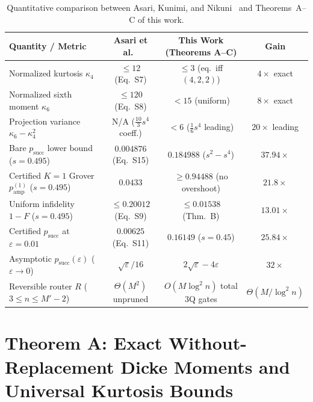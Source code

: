 \documentclass[11pt,a4paper]{article}
\theoremstyle{remark}
\begin{document}
\begin{table}[t]
\centering
\caption{Quantitative comparison between Asari, Kunimi, and Nikuni~\cite{AKN26} and Theorems~A--C of this work.}
\label{tab:summary}
\footnotesize
\setlength{\tabcolsep}{4.5pt}
\begin{tabular}{@{}lccc@{}}
\toprule
Quantity / Metric & Asari et al.~\cite{AKN26} & This Work (Theorems A--C) & Gain \\
\midrule
Normalized kurtosis $\kappa_4$ & $\le 12$ (Eq.~S7) & $\le 3$ (eq.\ iff $(4,2,2)$) & $4\times$ exact \\
Normalized sixth moment $\kappa_6$ & $\le 120$ (Eq.~S8) & $< 15$ (uniform) & $8\times$ exact \\
Projection variance $\kappa_6 - \kappa_4^2$ & N/A ($\frac{10}{3} s^4$ coeff.) & $< 6$ ($\frac{1}{6} s^4$ leading) & $20\times$ leading \\
Bare $p_{\mathrm{succ}}$ lower bound ($s = 0.495$) & $0.004876$ (Eq.~S15) & $0.184988$ ($s^2 - s^4$) & $37.94\times$ \\
Certified $K=1$ Grover $p_{\mathrm{amp}}^{(1)}$ ($s = 0.495$) & $0.0433$ & $\ge 0.94488$ (no overshoot) & $21.8\times$ \\
Uniform infidelity $1 - F$ ($s = 0.495$) & $\le 0.20012$ (Eq.~S9) & $\le 0.01538$ (Thm.~B) & $13.01\times$ \\
Certified $p_{\mathrm{succ}}$ at $\varepsilon = 0.01$ & $0.00625$ (Eq.~S11) & $0.16149$ ($s = 0.45$) & $25.84\times$ \\
Asymptotic $p_{\mathrm{succ}}(\varepsilon)$ ($\varepsilon \to 0$) & $\sqrt{\varepsilon}/16$ & $2\sqrt{\varepsilon} - 4\varepsilon$ & $32\times$ \\
Reversible router $R$ ($3 \le n \le M'-2$) & $\Theta(M^2)$ unpruned & $O(M\log^2 n)$ total 3Q gates & $\Theta(M/\log^2 n)$ \\
\bottomrule
\end{tabular}
\end{table}

\section{Theorem A: Exact Without-Replacement Dicke Moments and Universal Kurtosis Bounds}
\label{sec:theoremA}
\end{document}
